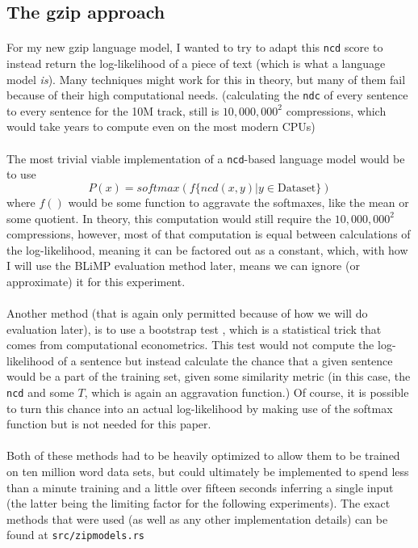 \documentclass[11pt]{article}
\begin{document}
\subsection{The gzip approach}

\paragraph{}
For my new gzip language model, I wanted to try to adapt this \verb|ncd| score to instead return the log-likelihood of a piece of text (which is what a language model \textit{is}). Many techniques might work for this in theory, but many of them fail because of their high computational needs. (calculating the \verb|ndc| of every sentence to every sentence for the 10M track, still is $10,000,000^2$ compressions, which would take years to compute even on the most modern CPUs)

\paragraph{}
The most trivial viable implementation of a \verb|ncd|-based language model would be to use
$$P(x) = softmax(f\{ncd(x, y) | y \in \mathrm{Dataset}\})$$
where $f()$ would be some function to aggravate the softmaxes, like the mean or some quotient. In theory, this computation would still require the $10,000,000^2$ compressions, however, most of that computation is equal between calculations of the log-likelihood, meaning it can be factored out as a constant, which, with how I will use the BLiMP evaluation method later, means we can ignore (or approximate) it for this experiment.

\paragraph{}
Another method (that is again only permitted because of how we will do evaluation later), is to use a bootstrap test \parencite{hesterberg2011bootstrap}, which is a statistical trick that comes from computational econometrics. This test would not compute the log-likelihood of a sentence but instead calculate the chance that a given sentence would be a part of the training set, given some similarity metric (in this case, the \verb|ncd| and some $T$, which is again an aggravation function.) Of course, it is possible to turn this chance into an actual log-likelihood by making use of the softmax function but is not needed for this paper.

\paragraph{}
Both of these methods had to be heavily optimized to allow them to be trained on ten million word data sets, but could ultimately be implemented to spend less than a minute training and a little over fifteen seconds inferring a single input (the latter being the limiting factor for the following experiments). The exact methods that were used (as well as any other implementation details) can be found at \verb|src/zipmodels.rs|
\end{document}
